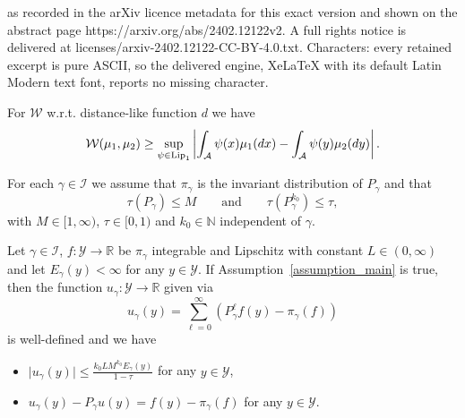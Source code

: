 \documentclass[10pt,a4paper]{amsart}
\newcommand{\N}{\mathbb{N}}
\newcommand{\R}{\mathbb{R}}
\newcommand{\cA}{\mathcal{A}}
\newcommand{\cY}{\mathcal{Y}}
\renewcommand{\d}{{\rm d}}
\begin{document}
as recorded in the arXiv licence metadata for this exact version and shown on the abstract page https://arxiv.org/abs/2402.12122v2. A full rights notice is delivered at licenses/arxiv-2402.12122-CC-BY-4.0.txt. Characters: every retained excerpt is pure ASCII, so the delivered engine, XeLaTeX with its default Latin Modern text font, reports no missing character.
\begin{lem}\label{lem:duality_inequality}
	For $\mathcal{W}$ w.r.t. distance-like function $d$ we have
	\[
	\mathcal{W}(\mu_1, \mu_2) \geq \sup_{\psi \in \text{Lip}_1} \left\vert  \int_\cA \psi(x) \mu_1(\d x) - \int_\cA \psi(y) \mu_2(\d y)  \right\vert.
	\]
\end{lem}

\begin{ass}\label{assumption_main}
	For each $\gamma \in \mathcal{I}$ we assume that $\pi_\gamma$ is the invariant distribution of $P_\gamma$ and that 
	\[
	\tau(P_\gamma) \leq M \qquad \text{and} \qquad
	\tau(P_\gamma^{k_0}) \leq \tau,
	\]
	with $M \in [1, \infty)$, $\tau \in [0,1)$ and $k_0 \in \N$ independent of $\gamma$.
\end{ass}

\begin{prop}\label{prop:poisson_equation_wasserstein_setting}
	Let $\gamma \in \mathcal{I}$, $f \colon \cY \to \R$ be $\pi_\gamma$ integrable and Lipschitz with constant $L \in (0, \infty)$ and let $E_\gamma (y) < \infty$ for any $y \in \cY$. 
	If Assumption~\ref{assumption_main} is true, then the function $u_\gamma\colon \cY \to \R$ given via 
	\[
	u_\gamma(y ) = \sum_{\ell=0}^\infty ( P_\gamma^\ell  f(y) - \pi_\gamma(f)) 
	\]   
	is well-defined and we have
	\begin{itemize}
		\item[i)] $\vert u_\gamma (y) \vert \leq \frac{k_0L M^{k_0} E_\gamma(y)}{1- \tau}$ for any $y \in \cY$,
		\item[ii)] $u_\gamma (y) - P_\gamma u(y) = f(y) - \pi_\gamma(f)$ for any $y \in \cY$.
	\end{itemize}
\end{prop}
\end{document}
